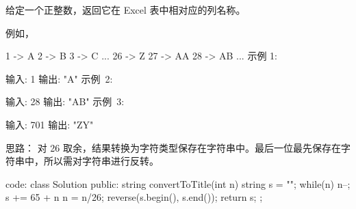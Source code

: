 给定一个正整数，返回它在 Excel 表中相对应的列名称。

例如，

    1 -> A
    2 -> B
    3 -> C
    ...
    26 -> Z
    27 -> AA
    28 -> AB 
    ...
示例 1:

输入: 1
输出: "A"
示例 2:

输入: 28
输出: "AB"
示例 3:

输入: 701
输出: "ZY"



























思路：
对 26 取余，结果转换为字符类型保存在字符串中。最后一位最先保存在字符串中，所以需对字符串进行反转。



























code:
class Solution {
public:
    string convertToTitle(int n) {
        string s = "";
        while(n)
        {
            n--;
            s += 65 + n%
            n = n/26;
        }
        reverse(s.begin(), s.end());
        return s;
    }
};